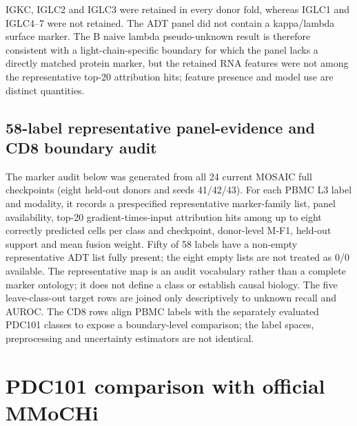 \documentclass[10pt]{article}
\begin{document}
\begin{table}[H]
\centering
\caption{Light-chain feature availability for interpreting the B naive lambda leave-class-out failure. RNA markers are checked after each train-only 3,000-gene selection. ADT reports whether a kappa/lambda-like surface marker is present in the 224-protein panel.}
\label{tab:light-chain}
\small

\end{table}

IGKC, IGLC2 and IGLC3 were retained in every donor fold, whereas IGLC1 and IGLC4--7 were not retained. The ADT panel did not contain a kappa/lambda surface marker. The B naive lambda pseudo-unknown result is therefore consistent with a light-chain-specific boundary for which the panel lacks a directly matched protein marker, but the retained RNA features were not among the representative top-20 attribution hits; feature presence and model use are distinct quantities.

\subsection*{58-label representative panel-evidence and CD8 boundary audit}

The marker audit below was generated from all 24 current MOSAIC full checkpoints (eight held-out donors and seeds 41/42/43). For each PBMC L3 label and modality, it records a prespecified representative marker-family list, panel availability, top-20 gradient-times-input attribution hits among up to eight correctly predicted cells per class and checkpoint, donor-level M-F1, held-out support and mean fusion weight. Fifty of 58 labels have a non-empty representative ADT list fully present; the eight empty lists are not treated as 0/0 available. The representative map is an audit vocabulary rather than a complete marker ontology; it does not define a class or establish causal biology. The five leave-class-out target rows are joined only descriptively to unknown recall and AUROC. The CD8 rows align PBMC labels with the separately evaluated PDC101 classes to expose a boundary-level comparison; the label spaces, preprocessing and uncertainty estimators are not identical.



\section{PDC101 comparison with official MMoCHi}
\end{document}

